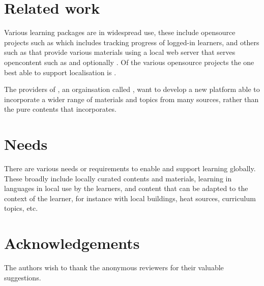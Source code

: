 \documentclass[11pt]{IEEEtran}
\begin{document}


\section*{Related work}
Various learning packages are in widespread use, these include opensource projects such as \cite{kalite} which includes tracking progress of logged-in learners, and others such as \cite{rachel} that provide various materials using a local web server that serves opencontent such as \cite{wikipedia-for-schools} and optionally \cite{kalite}. Of the various opensource projects the one best able to support localisation is \cite{kalite}. 

The providers of \cite{kalite}, an orgainsation called \cite{learning-equality}, want to develop a new platform able to incorporate a wider range of materials and topics from many sources, rather than the pure \cite{khanacademy} contents that \cite{kalite} incorporates.

\section*{Needs}
There are various needs or requirements to enable and support learning globally. These broadly include locally curated contents and materials, learning in languages in local use by the learners, and content that can be adapted to the context of the learner, for instance with local buildings, heat sources, curriculum topics, etc. 

\nocite{*}


\section*{Acknowledgements}
The authors wish to thank the anonymous reviewers for their valuable
suggestions.

\printbibliography
\end{document}
